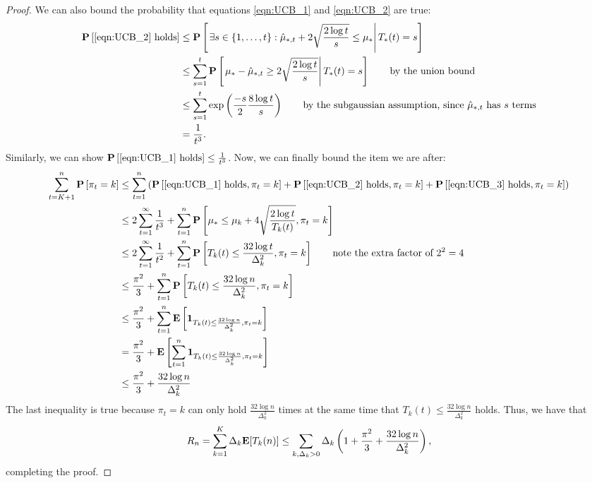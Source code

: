 \begin{proof}
We can also bound the probability that equations \eqref{eqn:UCB_1} and \eqref{eqn:UCB_2} are true:
\begin{align*}
\mathbf{P} \left[\text{\eqref{eqn:UCB_2} holds} \right] & \leq \mathbf{P} \left[ \left. \exists s \in \{1, \ldots, t\}: \hat \mu_{*, t} + 2 \sqrt{\frac{2 \log t}{s}} \leq \mu_* \right| T_*(t) = s \right] \\
&\leq \sum_{s = 1}^t \mathbf{P} \left[ \left. \mu_* - \hat \mu_{*, t} \geq 2 \sqrt{\frac{2 \log t}{s}} \right| T_*(t) = s \right] \qquad \text{by the union bound}\\
&\leq \sum_{s=1}^t \exp \left(\frac{-s}{2} \frac{8 \log t}{s}\right) \qquad \text{by the subgaussian assumption, since $\hat \mu_{*, t}$ has $s$ terms} \\
&= \frac{1}{t^3}.
\end{align*}
Similarly, we can show $\mathbf{P} \left[ \text{\eqref{eqn:UCB_1} holds}\right] \leq \frac{1}{t^3}$.
\allowdisplaybreaks
Now, we can finally bound the item we are after:
\begin{align*}
\sum_{t=K+1}^n \mathbf{P} \left[\pi_t = k \right] & \leq \sum_{t=1}^n \left(\mathbf{P} \left[ \text{\eqref{eqn:UCB_1} holds}, \pi_t = k\right] + \mathbf{P}\left[ \text{\eqref{eqn:UCB_2} holds}, \pi_t = k\right] + \mathbf{P}\left[\text{\eqref{eqn:UCB_3} holds}, \pi_t = k\right] \right) \\
&\leq 2 \sum_{t=1}^\infty \frac{1}{t^3} + \sum_{t=1}^n \mathbf{P} \left[\mu_* \leq \mu_k + 4 \sqrt{\frac{2 \log t}{T_k(t)}}, \pi_t = k \right] \\
&\leq 2 \sum_{t=1}^\infty \frac{1}{t^2} + \sum_{t=1}^n \mathbf{P}\left[T_k(t) \leq \frac{32 \log t}{\Delta_k^2}, \pi_t = k \right]
\qquad \text{note the extra factor of $2^2 = 4$} \\
& \leq \frac{\pi^2}{3} + \sum_{t=1}^n \mathbf{P}\left[T_k(t) \leq \frac{32 \log n}{\Delta_k^2}, \pi_t = k \right] \\
& \leq \frac{\pi^2}{3} + \sum_{t=1}^n \mathbf{E} \left[\mathbf{1}_{T_k(t) \leq \frac{32 \log n}{\Delta^2_k}, \pi_t = k}\right] \\ 
&= \frac{\pi^2}{3} +  \mathbf{E} \left[\sum_{t=1}^n \mathbf{1}_{T_k(t) \leq \frac{32 \log n}{\Delta^2_k}, \pi_t = k}\right] \\
&\leq \frac{\pi^2}{3} + \frac{32 \log n}{\Delta_k^2} \qquad
\end{align*}
\allowdisplaybreaks[0]
The last inequality is true because $\pi_t = k$ can only hold $\frac{32 \log n}{\Delta^2_k}$ times at the same time that $T_k(t) \leq \frac{32 \log n}{\Delta^2_k}$ holds.
Thus, we have that
\[
R_n = \sum_{k=1}^K \Delta_k \mathbf{E} [T_k(n)] \leq \sum_{k, \Delta_k > 0} \Delta_k \left(1 + \frac{\pi^2}{3} + \frac{32 \log n}{\Delta_k^2} \right),
\]
completing the proof.
\end{proof}

